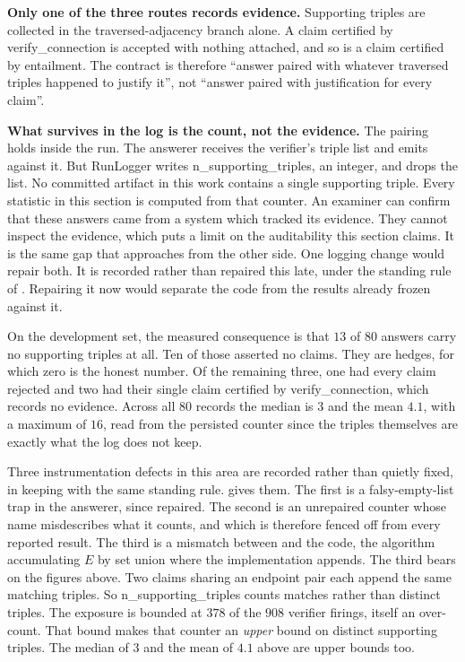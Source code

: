 \textbf{Only one of the three routes records evidence.} Supporting triples are
collected in the traversed-adjacency branch alone. A claim certified by
\textsf{verify\_connection} is accepted with nothing attached, and so is a claim
certified by entailment. The contract is therefore ``answer paired with whatever
traversed triples happened to justify it'', not ``answer paired with
justification for every claim''.

\textbf{What survives in the log is the count, not the evidence.} The pairing
holds inside the run. The answerer receives the verifier's triple list and emits
against it. But \textsf{RunLogger} writes \textsf{n\_supporting\_triples}, an
integer, and drops the list. No committed artifact in this work contains a
single supporting triple. Every statistic in this section is computed from that
counter. An examiner can confirm that these answers came from a system which
tracked its evidence. They cannot inspect the evidence, which puts a limit on
the auditability this section claims. It is the same gap that
 approaches from the other side. One logging change
would repair both. It is recorded rather than repaired this late, under the
standing rule of . Repairing it now would separate
the code from the results already frozen against it.

On the development set, the measured consequence is that $13$ of $80$ answers
carry no supporting triples at all. Ten of those asserted no claims. They are
hedges, for which zero is the honest number. Of the remaining three, one had
every claim rejected and two had their single claim certified by
\textsf{verify\_connection}, which records no evidence. Across all $80$ records
the median is $3$ and the mean $4.1$, with a maximum of $16$, read from the
persisted counter since the triples themselves are exactly what the log does not
keep.

Three instrumentation defects in this area are recorded rather than quietly
fixed, in keeping with the same standing rule.  gives
them. The first is a falsy-empty-list trap in the answerer, since repaired. The
second is an unrepaired counter whose name misdescribes what it counts, and
which is therefore fenced off from every reported result. The third is a
mismatch between  and the code, the algorithm accumulating $E$
by set union where the implementation appends. The third bears on the figures
above. Two claims sharing an endpoint pair each append the same matching
triples. So \textsf{n\_supporting\_triples} counts matches rather than distinct
triples. The exposure is bounded at $378$ of the $908$ verifier firings, itself
an over-count. That bound makes that counter an \emph{upper} bound on distinct
supporting triples. The median of $3$ and the mean of $4.1$ above are upper
bounds too.

